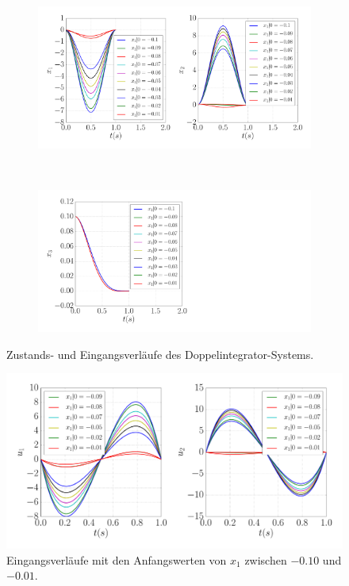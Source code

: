 \begin{figure}[!h]
	\centering
	\begin{subfigure}[c]{\textwidth}
		\centering
		\label{fig:Pytra_x1_-0.09_0.0_deltax=0.01_x_1}
		\includegraphics[width=0.9\linewidth]{bild/30_32/Brockett_e2_local/Pytra_x1_-009_00_deltax=001_x.pdf}
	\end{subfigure}\\
	\begin{subfigure}[c]{\textwidth}
		\centering
		\label{fig:Pytra_x1_-0.09_0.0_deltax=0.01_x_3}
		\hspace*{-1.7cm}
		\includegraphics[width=0.85\linewidth]{bild/30_32/Brockett_e2_local/Pytra_x1_-009_00_deltax=001_x_3.pdf}
	\end{subfigure}
	\caption{Zustands- und Eingangsverläufe des Doppelintegrator-Systems.}
	\label{fig:Pytra_x1_-0.09_0.0_deltax=0.01_x}
\end{figure}

\begin{figure}[!h]
	\centering
	\includegraphics[width=0.9\linewidth]{bild/30_32/Brockett_e2_local/Pytra_x1_-009_00_deltax=001_u.pdf}%
	\caption{Eingangsverläufe mit den Anfangswerten von $x_{1}$ zwischen $-0.10$ und $-0.01$.}
	\label{fig:Pytra_x1_-0.09_0.0_deltax=0.01_u}
\end{figure}

